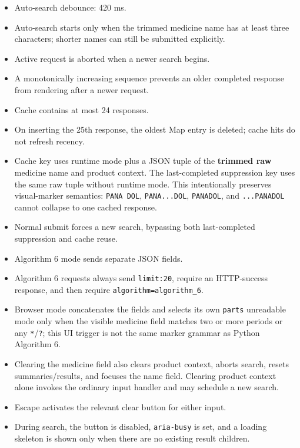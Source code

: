 \begin{itemize}
\tightlist
\item
  Auto-search debounce: 420 ms.
\item
  Auto-search starts only when the trimmed medicine name has at least three characters; shorter names can still be submitted explicitly.
\item
  Active request is aborted when a newer search begins.
\item
  A monotonically increasing sequence prevents an older completed response from rendering after a newer request.
\item
  Cache contains at most 24 responses.
\item
  On inserting the 25th response, the oldest Map entry is deleted; cache hits do not refresh recency.
\item
  Cache key uses runtime mode plus a JSON tuple of the \textbf{trimmed raw} medicine name and product context. The last-completed suppression key uses the same raw tuple without runtime mode. This intentionally preserves visual-marker semantics: \texttt{PANA\ DOL}, \texttt{PANA...DOL}, \texttt{PANADOL}, and \texttt{...PANADOL} cannot collapse to one cached response.
\item
  Normal submit forces a new search, bypassing both last-completed suppression and cache reuse.
\item
  Algorithm 6 mode sends separate JSON fields.
\item
  Algorithm 6 requests always send \texttt{limit:20}, require an HTTP-success response, and then require \texttt{algorithm=algorithm\_\allowbreak{}6}.
\item
  Browser mode concatenates the fields and selects its own \texttt{parts} unreadable mode only when the visible medicine field matches two or more periods or any \texttt{*}/\texttt{?}; this UI trigger is not the same marker grammar as Python Algorithm 6.
\item
  Clearing the medicine field also clears product context, aborts search, resets summaries/results, and focuses the name field. Clearing product context alone invokes the ordinary input handler and may schedule a new search.
\item
  Escape activates the relevant clear button for either input.
\item
  During search, the button is disabled, \texttt{aria-busy} is set, and a loading skeleton is shown only when there are no existing result children.
\end{itemize}

